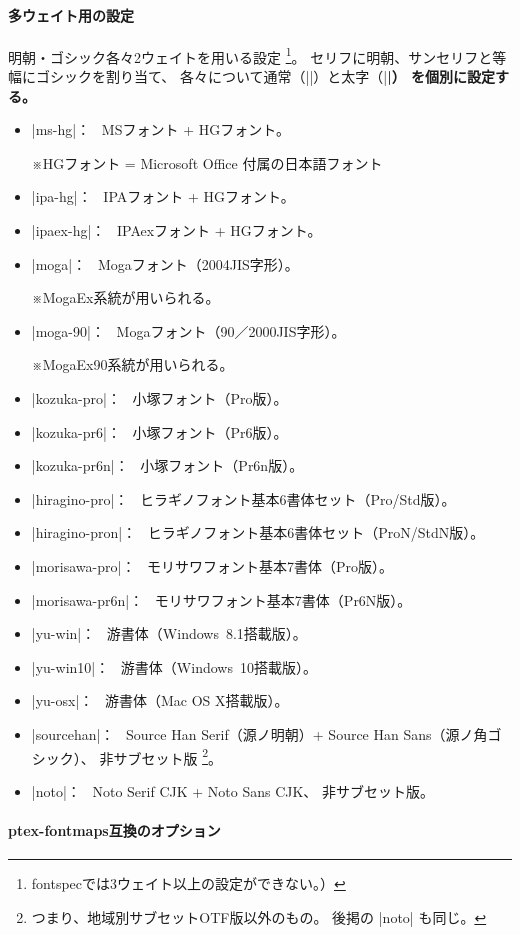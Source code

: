 \documentclass[xelatex,ja=standard,a4paper]{bxjsarticle}
\newcommand{\Pkg}[1]{\textsf{#1}}
\newcommand{\Note}{\par\noindent ※}
\newcommand{\Means}{：\ }
\begin{document}
\paragraph{多ウェイト用の設定}
明朝・ゴシック各々2ウェイトを用いる設定
\footnote{\Pkg{fontspec}では3ウェイト以上の設定ができない。）}。
セリフに明朝、サンセリフと等幅にゴシックを割り当て、
各々について通常（|\mdseries|）と太字（|\bfseries|）
を個別に設定する。
\begin{itemize}
\item |ms-hg|\Means
  MSフォント + HGフォント。
  \Note HGフォント = Microsoft Office 付属の日本語フォント
\item |ipa-hg|\Means
  IPAフォント + HGフォント。
\item |ipaex-hg|\Means
  IPAexフォント + HGフォント。
\item |moga|\Means
  Mogaフォント（2004JIS字形）。
  \Note MogaEx系統が用いられる。
\item |moga-90|\Means
  Mogaフォント（90／2000JIS字形）。
  \Note MogaEx90系統が用いられる。
\item |kozuka-pro|\Means
  小塚フォント（Pro版）。
\item |kozuka-pr6|\Means
  小塚フォント（Pr6版）。
\item |kozuka-pr6n|\Means
  小塚フォント（Pr6n版）。
\item |hiragino-pro|\Means
  ヒラギノフォント基本6書体セット（Pro/Std版）。
\item |hiragino-pron|\Means
  ヒラギノフォント基本6書体セット（ProN/StdN版）。
\item |morisawa-pro|\Means
  モリサワフォント基本7書体（Pro版）。
\item |morisawa-pr6n|\Means
  モリサワフォント基本7書体（Pr6N版）。
\item |yu-win|\Means
  游書体（Windows~8.1搭載版）。
\item |yu-win10|\Means
  游書体（Windows~10搭載版）。%
\item |yu-osx|\Means
  游書体（Mac OS X搭載版）。
\item |sourcehan|\Means
  Source Han Serif（源ノ明朝）+ Source Han Sans（源ノ角ゴシック）、
  非サブセット版%
  \footnote{つまり、地域別サブセットOTF版以外のもの。
    後掲の |noto| も同じ。}。
\item |noto|\Means
  Noto Serif CJK + Noto Sans CJK、
  非サブセット版。
\end{itemize}

\paragraph{ptex-fontmaps互換のオプション}
\end{document}

